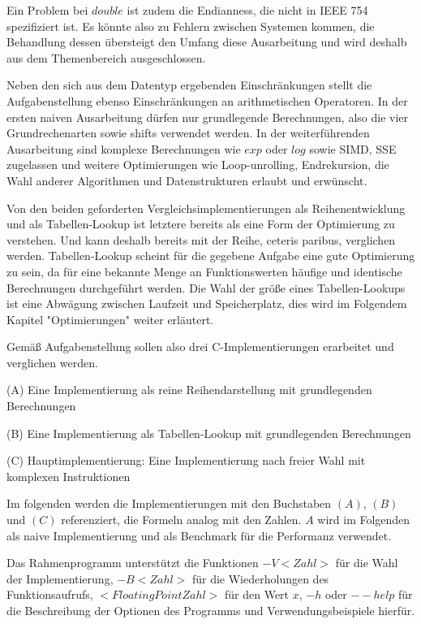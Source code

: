 \documentclass[course=erap] {aspdoc}
\begin{document}
    Ein Problem bei $double$ ist zudem die Endianness, die nicht in IEEE 754~\cite{StandardforBinaryFloating-PointArithmetic} spezifiziert ist.
    Es könnte also zu Fehlern zwischen Systemen kommen, die Behandlung dessen übersteigt den Umfang diese Ausarbeitung und wird deshalb aus dem Themenbereich ausgeschlossen.


    Neben den sich aus dem Datentyp ergebenden Einschränkungen stellt die Aufgabenstellung ebenso Einschränkungen an arithmetischen Operatoren.
    In der ersten naiven Ausarbeitung dürfen nur grundlegende Berechnungen, also die vier Grundrechenarten sowie shifts verwendet werden.
    In der weiterführenden Ausarbeitung sind komplexe Berechnungen wie $exp$ oder $log$ sowie SIMD, SSE zugelassen und weitere Optimierungen wie Loop-unrolling, Endrekursion, die Wahl anderer Algorithmen und Datenstrukturen erlaubt und erwünscht.


    Von den beiden geforderten Vergleichsimplementierungen als Reihenentwicklung und als Tabellen-Lookup ist letztere bereits als eine Form der Optimierung zu verstehen.
    Und kann deshalb bereits mit der Reihe, ceteris paribus, verglichen werden.
    Tabellen-Lookup scheint für die gegebene Aufgabe eine gute Optimierung zu sein, da für eine bekannte Menge an Funktionswerten häufige und identische Berechnungen durchgeführt werden.
    Die Wahl der größe eines Tabellen-Lookups ist eine Abwägung zwischen Laufzeit und Speicherplatz, dies wird im Folgendem Kapitel "Optimierungen" weiter erläutert.


    Gemäß Aufgabenstellung sollen also drei C-Implementierungen erarbeitet und verglichen werden.


    (A) Eine Implementierung als reine Reihendarstellung mit grundlegenden Berechnungen


    (B) Eine Implementierung als Tabellen-Lookup mit grundlegenden Berechnungen


    (C) Hauptimplementierung: Eine Implementierung nach freier Wahl mit komplexen Instruktionen


    Im folgenden werden die Implementierungen mit den Buchstaben $(A)$, $(B)$ und $(C)$ referenziert, die Formeln analog mit den Zahlen.
    $A$ wird im Folgenden als naive Implementierung und als Benchmark für die Performanz verwendet.


    Das Rahmenprogramm unterstützt die Funktionen $-V<Zahl>$ für die Wahl der Implementierung, $-B<Zahl>$ für die Wiederholungen des Funktionsaufrufs, $<Floating Point Zahl>$ für den Wert $x$, $-h$ oder $--help$ für die Beschreibung der Optionen des Programms und Verwendungsbeispiele hierfür.
\end{document}
